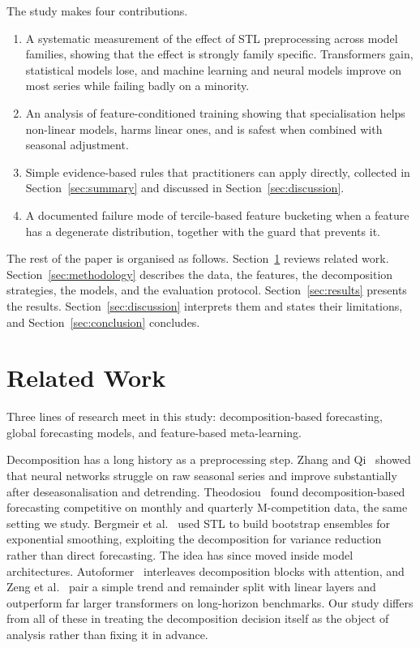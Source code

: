 \documentclass[pdflatex,sn-mathphys-num]{sn-jnl}
\theoremstyle{thmstyleone}
\theoremstyle{thmstyletwo}
\theoremstyle{thmstylethree}
\begin{document}
The study makes four contributions.
\begin{enumerate}
  \item A systematic measurement of the effect of STL preprocessing across
    model families, showing that the effect is strongly family specific.
    Transformers gain, statistical models lose, and machine learning and
    neural models improve on most series while failing badly on a minority.
  \item An analysis of feature-conditioned training showing that
    specialisation helps non-linear models, harms linear ones, and is safest
    when combined with seasonal adjustment.
  \item Simple evidence-based rules that practitioners can apply directly,
    collected in Section~\ref{sec:summary} and discussed in
    Section~\ref{sec:discussion}.
  \item A documented failure mode of tercile-based feature bucketing when a
    feature has a degenerate distribution, together with the guard that
    prevents it.
\end{enumerate}

The rest of the paper is organised as follows. Section~\ref{sec:related}
reviews related work. Section~\ref{sec:methodology} describes the data, the
features, the decomposition strategies, the models, and the evaluation
protocol. Section~\ref{sec:results} presents the results.
Section~\ref{sec:discussion} interprets them and states their limitations, and
Section~\ref{sec:conclusion} concludes.

\section{Related Work}\label{sec:related}

Three lines of research meet in this study: decomposition-based forecasting,
global forecasting models, and feature-based meta-learning.

Decomposition has a long history as a preprocessing step. Zhang and
Qi~\cite{zhang2005neural} showed that neural networks struggle on raw seasonal
series and improve substantially after deseasonalisation and detrending.
Theodosiou~\cite{theodosiou2011stl} found decomposition-based forecasting
competitive on monthly and quarterly M-competition data, the same setting we
study. Bergmeir et al.~\cite{bergmeir2016bagging} used STL to build bootstrap
ensembles for exponential smoothing, exploiting the decomposition for variance
reduction rather than direct forecasting. The idea has since moved inside
model architectures. Autoformer~\cite{wu2021autoformer} interleaves
decomposition blocks with attention, and Zeng et
al.~\cite{zeng2023dlinear} pair a simple trend and remainder split with linear
layers and outperform far larger transformers on long-horizon benchmarks. Our
study differs from all of these in treating the decomposition decision itself
as the object of analysis rather than fixing it in advance.
\end{document}
